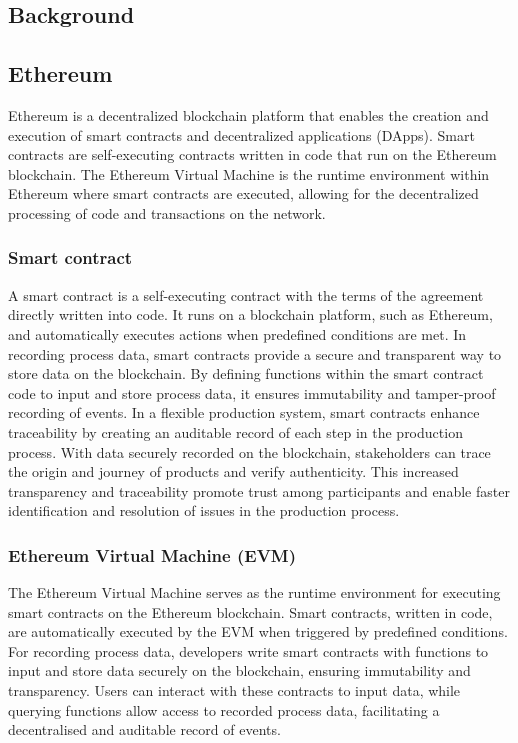 \begin{bibunit}
\section{Background}
\label{sec:background}

\subsection{Ethereum}
\label{ethereum}
Ethereum \cite{buterin2014nextgeneration} is a decentralized blockchain platform that enables the creation and execution of smart contracts and decentralized applications (DApps). Smart contracts are self-executing contracts written in code that run on the Ethereum blockchain. The Ethereum Virtual Machine is the runtime environment within Ethereum where smart contracts are executed, allowing for the decentralized processing of code and transactions on the network.

\subsubsection{Smart contract}
\label{SC}
A smart contract \cite{oliva2020exploratory} is a self-executing contract with the terms of the agreement directly written into code. It runs on a blockchain platform, such as Ethereum, and automatically executes actions when predefined conditions are met. In recording process data, smart contracts provide a secure and transparent way to store data on the blockchain. By defining functions within the smart contract code to input and store process data, it ensures immutability and tamper-proof recording of events. In a flexible production system, smart contracts enhance traceability by creating an auditable record of each step in the production process. With data securely recorded on the blockchain, stakeholders can trace the origin and journey of products and verify authenticity. This increased transparency and traceability promote trust among participants and enable faster identification and resolution of issues in the production process.

\subsubsection{Ethereum Virtual Machine (EVM)}
\label{EVM}
The Ethereum Virtual Machine \cite{hildenbrandt2018kevm} serves as the runtime environment for executing smart contracts on the Ethereum blockchain. Smart contracts, written in code, are automatically executed by the EVM when triggered by predefined conditions. For recording process data, developers write smart contracts with functions to input and store data securely on the blockchain, ensuring immutability and transparency. Users can interact with these contracts to input data, while querying functions allow access to recorded process data, facilitating a decentralised and auditable record of events.


\end{bibunit}
